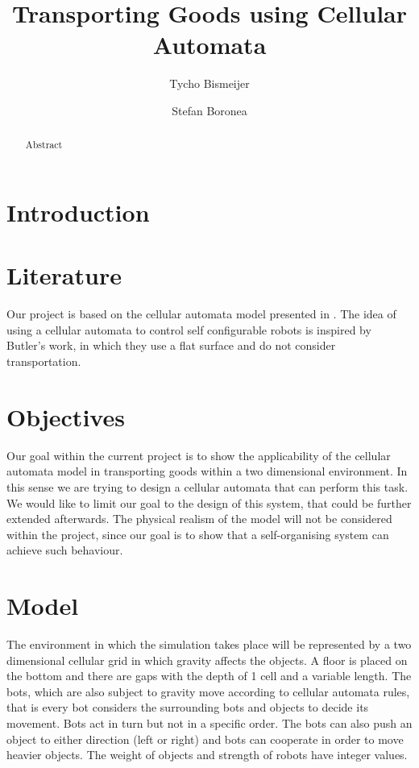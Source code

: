 \documentclass[runningheads]{llncs}
\title{Transporting Goods using Cellular Automata}
\author{Tycho Bismeijer\inst{1} \and Stefan Boronea\inst{1}}
\institute{Faculty of Exact Sciences, Vrije Universiteit Amsterdam}
\date{}
\begin{document}
\maketitle

\begin{abstract}
Abstract
\end{abstract}

\section{Introduction}

\section{Literature}
Our project is based on the cellular automata model presented in \cite{1013457}. The idea of using a cellular automata to control self configurable robots is inspired by Butler's work, in which they use a flat surface and do not consider transportation.

\section{Objectives}
Our goal within the current project is to show the applicability of the cellular automata model in transporting goods within a two dimensional environment. In this sense we are trying to design a cellular automata that can perform this task. We would like to limit our goal to the design of this system, that could be further extended afterwards. The physical realism of the model will not be considered within the project, since our goal is to show that a self-organising system can achieve such behaviour.

\section{Model}
The environment in which the simulation takes place will be represented by a two dimensional cellular grid in which gravity affects the objects. A floor is placed on the bottom and there are gaps with the depth of 1 cell and a variable length. The bots, which are also subject to gravity move according to cellular automata rules, that is every bot considers the surrounding bots and objects to decide its movement. Bots act in turn but not in a specific order. The bots can also push an object to either direction (left or right) and bots can cooperate in order to move heavier objects. The weight of objects and strength of robots have integer values.
\end{document}
